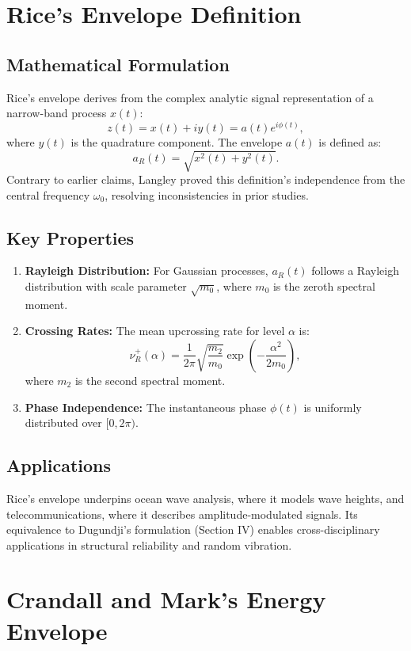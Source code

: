 \documentclass[12pt]{article}
\begin{document}
\section{Rice’s Envelope Definition}

\subsection{Mathematical Formulation}
Rice’s envelope derives from the complex analytic signal representation of a narrow-band process $x(t)$:
\[
z(t) = x(t) + iy(t) = a(t)e^{i\phi(t)},
\]
where $y(t)$ is the quadrature component. The envelope $a(t)$ is defined as:
\[
a_R(t) = \sqrt{x^2(t) + y^2(t)}.
\]
Contrary to earlier claims, Langley proved this definition’s independence from the central frequency $\omega_0$, resolving inconsistencies in prior studies.

\subsection{Key Properties}
\begin{enumerate}
    \item \textbf{Rayleigh Distribution:} For Gaussian processes, $a_R(t)$ follows a Rayleigh distribution with scale parameter $\sqrt{m_0}$, where $m_0$ is the zeroth spectral moment.
    \item \textbf{Crossing Rates:} The mean upcrossing rate for level $\alpha$ is:
    \[
    \nu_R^+(\alpha) = \frac{1}{2\pi}\sqrt{\frac{m_2}{m_0}} \exp\left(-\frac{\alpha^2}{2m_0}\right),
    \]
    where $m_2$ is the second spectral moment.
    \item \textbf{Phase Independence:} The instantaneous phase $\phi(t)$ is uniformly distributed over $[0, 2\pi)$.
\end{enumerate}

\subsection{Applications}
Rice’s envelope underpins ocean wave analysis, where it models wave heights, and telecommunications, where it describes amplitude-modulated signals. Its equivalence to Dugundji’s formulation (Section IV) enables cross-disciplinary applications in structural reliability and random vibration.

\section{Crandall and Mark’s Energy Envelope}
\end{document}
